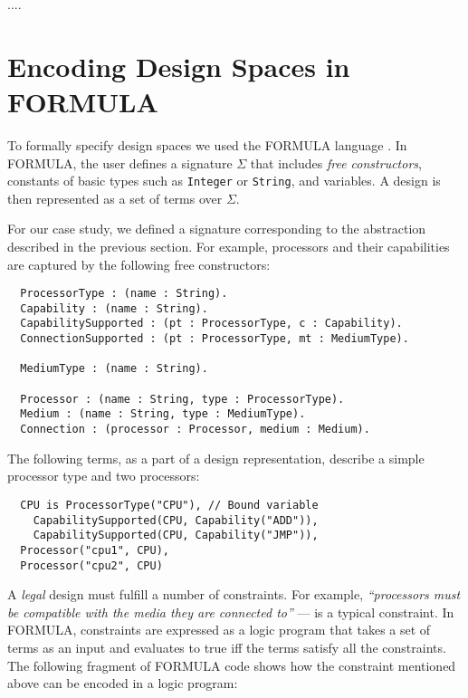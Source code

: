 \documentclass[conference]{IEEEtran}
\newcommand{\FORMULA}{FORMULA}%
\begin{document}
....

\section{Encoding Design Spaces in \FORMULA} \label{Encoding}

\newcommand{\DataSig}{\Sigma}
\newcommand{\FreeCons}{F}
\newcommand{\Consts}{C}
\newcommand{\Vars}{V} 

To formally specify design spaces we used the \FORMULA{} language \cite{??}. In \FORMULA{}, the user defines a signature $\DataSig$ that includes \emph{free constructors}, constants of basic types such as \texttt{Integer} or \texttt{String}, and variables. A design is then represented as a set of terms over $\DataSig$. 

For our case study, we defined a signature corresponding to the abstraction described in the previous section. For example, processors and their capabilities are captured by the following free constructors:

{\scriptsize\begin{verbatim}
  ProcessorType : (name : String).    
  Capability : (name : String).
  CapabilitySupported : (pt : ProcessorType, c : Capability).    
  ConnectionSupported : (pt : ProcessorType, mt : MediumType).
    
  MediumType : (name : String).

  Processor : (name : String, type : ProcessorType).
  Medium : (name : String, type : MediumType).    
  Connection : (processor : Processor, medium : Medium).
\end{verbatim}}

The following terms, as a part of a design representation, describe a simple processor type and two processors:    

{\scriptsize\begin{verbatim}
  CPU is ProcessorType("CPU"), // Bound variable
    CapabilitySupported(CPU, Capability("ADD")),
    CapabilitySupported(CPU, Capability("JMP")),
  Processor("cpu1", CPU),
  Processor("cpu2", CPU)
\end{verbatim}}

A \emph{legal} design must fulfill a number of constraints. For example, 
\emph{``processors must be compatible with the media they are connected to''} --- is a typical constraint.
In \FORMULA{}, constraints are expressed as a logic program that takes a set of terms as an input and evaluates to true iff the terms satisfy all the constraints. The following fragment of \FORMULA{} code shows how the constraint mentioned above can be encoded in a logic program:
\end{document}
